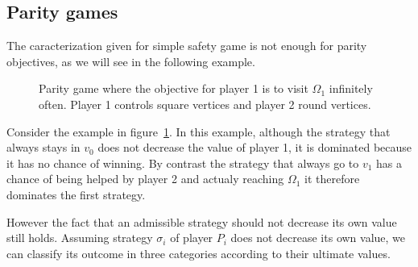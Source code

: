 \subsection{Parity games}\label{parity-games}

The caracterization given for simple safety game is not enough for
parity objectives, as we will see in the following example.

\begin{figure}
  \begin{center}
    \caption{Parity game where the objective for player 1 is to visit
      $\Omega_1$ infinitely often. Player 1 controls square vertices and player 2
      round vertices.}
    \label{fig:adm-parity}
  \end{center}
\end{figure}

\begin{example}
  Consider the example in figure~\ref{fig:adm-parity}.
  In this example, although the strategy that always stays in $v_0$
  does not decrease the value of player 1, it is dominated because
  it has no chance of winning.
  By contrast the strategy that always go to $v_1$ has a chance of
  being helped by player 2 and actualy reaching $\Omega_1$ it therefore
  dominates the first strategy.
\end{example}

However the fact that an admissible strategy should not decrease its own
value still holds. Assuming strategy \(\sigma_i\) of player \(P_i\) does
not decrease its own value, we can classify its outcome in three
categories according to their ultimate values.

